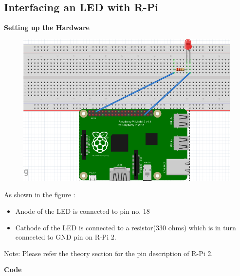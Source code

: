 \documentclass[11pt,a4paper]{article}
\begin{document}
	 \subsection{Interfacing an LED with R-Pi}
	 \textbf{Setting up the Hardware}
	 \begin{figure}[h!]
	 	\includegraphics[scale=0.4]{Led.png}
	 	\centering
	 \end{figure}
	 \newline
	 As shown in the figure :
	 \begin{itemize}
	 	\item Anode of the LED is connected to pin no. 18
	 	\item Cathode of the LED is connected to a resistor(330 ohms) which is in turn connected to GND pin on R-Pi 2.
	\end{itemize}
		Note: Please refer the theory section for the pin description of R-Pi 2.
	
	\newpage
	\flushleft
	\textbf{Code}
	
	
	\newpage
\end{document}

